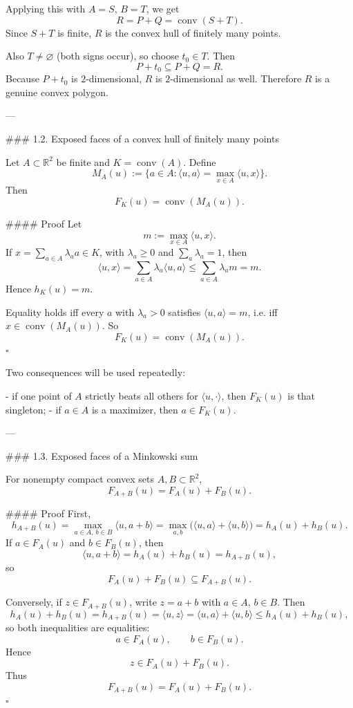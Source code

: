 Applying this with \(A=S\), \(B=T\), we get
\[
R=P+Q=\operatorname{conv}(S+T).
\]
Since \(S+T\) is finite, \(R\) is the convex hull of finitely many points.

Also \(T\neq \varnothing\) (both signs occur), so choose \(t_0\in T\). Then
\[
P+t_0\subseteq P+Q=R.
\]
Because \(P+t_0\) is \(2\)-dimensional, \(R\) is \(2\)-dimensional as well. Therefore \(R\) is a genuine convex polygon.

---

### 1.2. Exposed faces of a convex hull of finitely many points

Let \(A\subset \mathbb R^2\) be finite and \(K=\operatorname{conv}(A)\). Define
\[
M_A(u):=\{a\in A:\langle u,a\rangle=\max_{x\in A}\langle u,x\rangle\}.
\]
Then
\[
F_K(u)=\operatorname{conv}(M_A(u)).
\]

#### Proof
Let
\[
m:=\max_{x\in A}\langle u,x\rangle .
\]
If \(x=\sum_{a\in A}\lambda_a a\in K\), with \(\lambda_a\ge 0\) and \(\sum_a\lambda_a=1\), then
\[
\langle u,x\rangle=\sum_{a\in A}\lambda_a\langle u,a\rangle\le \sum_{a\in A}\lambda_a m=m.
\]
Hence \(h_K(u)=m\).

Equality holds iff every \(a\) with \(\lambda_a>0\) satisfies \(\langle u,a\rangle=m\), i.e. iff \(x\in \operatorname{conv}(M_A(u))\). So
\[
F_K(u)=\operatorname{conv}(M_A(u)).
\]
\(\square\)

Two consequences will be used repeatedly:

- if one point of \(A\) strictly beats all others for \(\langle u,\cdot\rangle\), then \(F_K(u)\) is that singleton;
- if \(a\in A\) is a maximizer, then \(a\in F_K(u)\).

---

### 1.3. Exposed faces of a Minkowski sum

For nonempty compact convex sets \(A,B\subset \mathbb R^2\),
\[
F_{A+B}(u)=F_A(u)+F_B(u).
\]

#### Proof
First,
\[
h_{A+B}(u)=\max_{a\in A,\ b\in B}\langle u,a+b\rangle
=\max_{a,b}\bigl(\langle u,a\rangle+\langle u,b\rangle\bigr)
=h_A(u)+h_B(u).
\]
If \(a\in F_A(u)\) and \(b\in F_B(u)\), then
\[
\langle u,a+b\rangle=h_A(u)+h_B(u)=h_{A+B}(u),
\]
so
\[
F_A(u)+F_B(u)\subseteq F_{A+B}(u).
\]

Conversely, if \(z\in F_{A+B}(u)\), write \(z=a+b\) with \(a\in A\), \(b\in B\). Then
\[
h_A(u)+h_B(u)=h_{A+B}(u)=\langle u,z\rangle
=\langle u,a\rangle+\langle u,b\rangle\le h_A(u)+h_B(u),
\]
so both inequalities are equalities:
\[
a\in F_A(u),\qquad b\in F_B(u).
\]
Hence
\[
z\in F_A(u)+F_B(u).
\]
Thus
\[
F_{A+B}(u)=F_A(u)+F_B(u).
\]
\(\square\)

